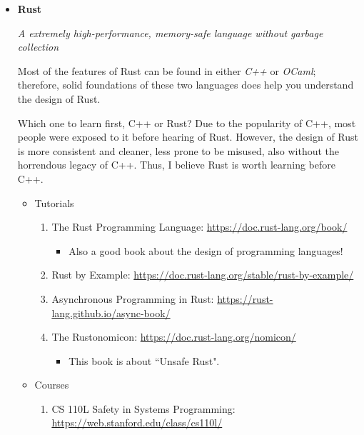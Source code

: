 \documentclass{article}
\begin{document}
\begin{itemize}
    \item \textbf{Rust}
    
    \emph{A extremely high-performance, memory-safe language without garbage collection}
    
    Most of the features of Rust can be found in either \emph{C++} or \emph{OCaml}; therefore, solid foundations of these two languages does help you understand the design of Rust.
    
    Which one to learn first, C++ or Rust?
    Due to the popularity of C++, most people were exposed to it before hearing of Rust.
    However, the design of Rust is more consistent and cleaner, less prone to be misused, also without the horrendous legacy of C++.
    Thus, I believe Rust is worth learning before C++.
    
    \begin{itemize}
        \item Tutorials
        \begin{enumerate}
            \item The Rust Programming Language:
            \href{https://doc.rust-lang.org/book/}{https://doc.rust-lang.org/book/}
            \begin{itemize}
                \item Also a good book about the design of programming languages!
            \end{itemize}
            \item Rust by Example:
            \href{https://doc.rust-lang.org/stable/rust-by-example/}{https://doc.rust-lang.org/stable/rust-by-example/}
            \item Asynchronous Programming in Rust:
            \href{https://rust-lang.github.io/async-book/}{https://rust-lang.github.io/async-book/}
            \item The Rustonomicon:
            \href{https://doc.rust-lang.org/nomicon/}{https://doc.rust-lang.org/nomicon/}
            \begin{itemize}
                \item This book is about ``Unsafe Rust".
            \end{itemize}
        \end{enumerate}
        \item Courses
        \begin{enumerate}
            \item CS 110L Safety in Systems Programming:\\
            \href{https://web.stanford.edu/class/cs110l/}{https://web.stanford.edu/class/cs110l/}

\end{enumerate}
\end{itemize}
\end{itemize}
\end{document}
